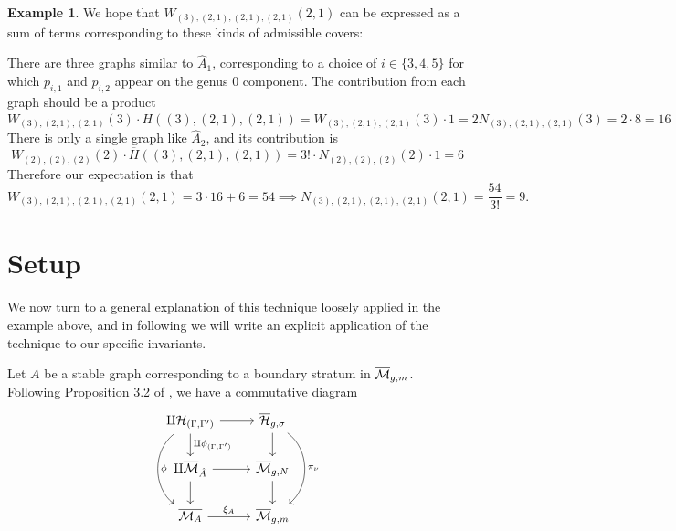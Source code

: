\documentclass[thesis]{thesis-umich}           %
\newcommand{\Hb}{\overline{\mathcal H}}
\theoremstyle{definition}
\newtheorem{eg}[thm]{Example}
\begin{document}
\begin{eg}

                                    We hope that $W_{(3),(2,1),(2,1),(2,1)}(2,1)$ can be expressed
                                    as a sum of terms corresponding to these kinds of
                                    admissible covers:

                                    There are three graphs similar to $\hat A_1$, corresponding to a choice of $i\in\{3,4,5\}$ for which $p_{i,1}$ and $p_{i,2}$ appear on the genus $0$ component. The contribution from each graph should be a product
                                    \[
                                    W_{(3),(2,1),(2,1)}(3)\cdot \overline H((3),(2,1),(2,1))=W_{(3),(2,1),(2,1)}(3)\cdot 1=2N_{(3),(2,1),(2,1)}(3)=2\cdot 8=16
                                    \]
                                    There is only a single graph like $\hat A_2$,
                                    and its contribution is
                                    \[
                                    W_{(2),(2),(2)}(2)\cdot \overline H((3),(2,1),(2,1))=3!\cdot N_{(2),(2),(2)}(2)\cdot 1=6
                                    \]
                                    Therefore our expectation is that
                                    \[
                                    W_{(3),(2,1),(2,1),(2,1)}(2,1)=3\cdot 16+6=54\implies N_{(3),(2,1),(2,1),(2,1)}(2,1)=\frac{54}{3!}=9.
                                    \]
  \end{eg}

                \section{Setup}

                We now turn to a general explanation of this technique loosely applied in the example above, and in following \cite{Generalized} we will write an explicit application of the technique to our specific invariants.
                


Let $A$ be a stable graph
corresponding to a boundary stratum in $\overline{\mathcal M}_{g,m}$.
Following Proposition 3.2 of \cite{Lian}, we have a commutative diagram
\[\begin{tikzcd}
\amalg \mathcal H_{(\Gamma,\Gamma')} & \Hb_{g,\sigma} \\
\amalg \mb_{\hat A} & \mb_{g,N} \\
	\overline{\mathcal M_A} & \mb_{g,m}
	\arrow[from=1-1, to=1-2]
	\arrow[from=1-1, to=2-1, "\amalg \phi_{(\Gamma,\Gamma')}"]
        \arrow[from=2-1, to=3-1]
	\arrow[from=1-2, to=2-2]
	\arrow[from=2-1, to=2-2]
        \arrow[from=2-2, to=3-2]
        \arrow[from=3-1, to=3-2, "\xi_A"]
        \arrow[from=1-2, to=3-2, bend left=52, "\pi_{\nu}"]
        \arrow[from=1-1, to=3-1, bend  right=52, "\phi"]
\end{tikzcd}\]
\end{document}
